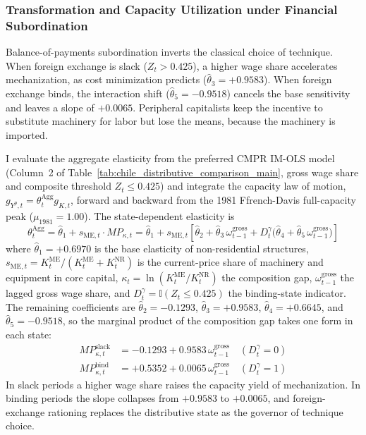 

\subsubsection{Transformation and Capacity Utilization under Financial Subordination}
\label{sec:443:chile_utilization}

Balance-of-payments subordination inverts the classical choice of technique.
When foreign exchange is slack ($Z_t > 0.425$), a higher wage share
accelerates mechanization, as cost minimization predicts
($\hat{\theta}_3 = +0.9583$). When foreign exchange binds, the interaction
shift ($\hat{\theta}_5 = -0.9518$) cancels the base sensitivity and leaves a
slope of $+0.0065$. Peripheral capitalists keep the incentive to substitute
machinery for labor but lose the means, because the machinery is imported.

I evaluate the aggregate elasticity from the preferred CMPR IM-OLS model
(Column~2 of Table~\ref{tab:chile_distributive_comparison_main}, gross wage
share and composite threshold $Z_t \le 0.425$) and integrate the capacity
law of motion, $g_{Y^p,t} = \theta_t^{\text{Agg}} g_{K,t}$, forward and
backward from the 1981 Ffrench-Davis full-capacity peak
($\mu_{1981} = 1.00$). The state-dependent elasticity is
\begin{equation}
	\theta_t^{\text{Agg}} = \hat{\theta}_1 + s_{\text{ME},t} \cdot MP_{\kappa,t}
	= \hat{\theta}_1 + s_{\text{ME},t} \left[ \hat{\theta}_2 + \hat{\theta}_3 \, \omega_{t-1}^{\text{gross}} + D_t^{\gamma} \bigl(\hat{\theta}_4 + \hat{\theta}_5 \, \omega_{t-1}^{\text{gross}}\bigr) \right]
	\label{eq:chile_theta_agg_def}
\end{equation}
where $\hat{\theta}_1 = +0.6970$ is the base elasticity of non-residential
structures, $s_{\text{ME},t} = K_t^{\text{ME}} / (K_t^{\text{ME}} + K_t^{\text{NR}})$
is the current-price share of machinery and equipment in core capital,
$\kappa_t = \ln(K_t^{\text{ME}} / K_t^{\text{NR}})$ the composition gap,
$\omega_{t-1}^{\text{gross}}$ the lagged gross wage share, and
$D_t^{\gamma} = \mathbb{I}(Z_t \le 0.425)$ the binding-state indicator. The
remaining coefficients are $\hat{\theta}_2 = -0.1293$,
$\hat{\theta}_3 = +0.9583$, $\hat{\theta}_4 = +0.6645$, and
$\hat{\theta}_5 = -0.9518$, so the marginal product of the composition gap
takes one form in each state:
\begin{align}
	MP_{\kappa,t}^{\text{slack}} &= -0.1293 + 0.9583 \, \omega_{t-1}^{\text{gross}} \quad (D_t^{\gamma} = 0) \label{eq:mp_slack} \\
	MP_{\kappa,t}^{\text{bind}}  &= +0.5352 + 0.0065 \, \omega_{t-1}^{\text{gross}} \quad (D_t^{\gamma} = 1) \label{eq:mp_bind}
\end{align}
In slack periods a higher wage share raises the capacity yield of
mechanization. In binding periods the slope collapses from $+0.9583$ to
$+0.0065$, and foreign-exchange rationing replaces the distributive state as
the governor of technique choice.

